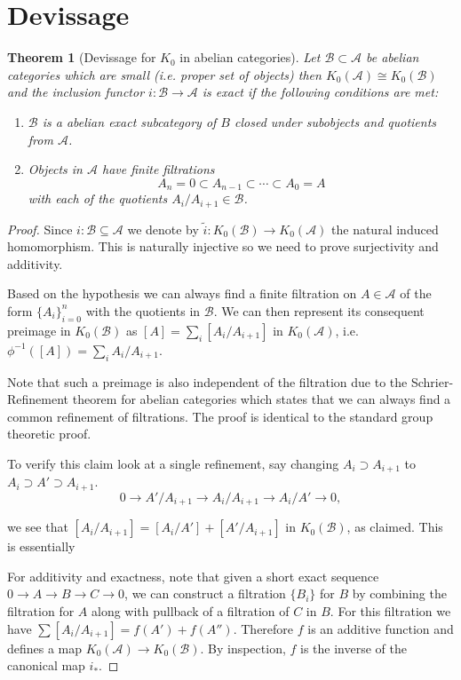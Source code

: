\documentclass[12pt]{report}
\numberwithin{equation}{section}
\newtheorem{theorem}[dummy]{Theorem}
\begin{document}
	\section{Devissage}
	\begin{theorem}[Devissage for $K_0$ in abelian categories]\label{devissagek0}
		Let $\mathcal B \subset \mathcal A$ be abelian categories which are small (i.e. proper set of objects) then $K_0(\mathcal A) \cong K_0(\mathcal B)$ and the inclusion functor $i:\mathcal{B} \to \mathcal{A}$ is exact if the following conditions are met:
		\begin{enumerate}
			\item $\mathcal B$ is a abelian exact subcategory of $B$ closed under subobjects and quotients from $\mathcal{A}$.
			\item Objects in $\mathcal{A}$ have finite filtrations \[ A_n=0 \subset A_{n-1} \subset \cdots \subset A_0 =A \] with each of the quotients $A_i/A_{i+1} \in \mathcal{B}$.
		\end{enumerate}
	\end{theorem}
	\begin{proof}
		Since $i:\mathcal{B} \subseteq \mathcal{A} $ we denote by $ \tilde{i} : K_0(\mathcal{B}) \to K_0(\mathcal{A})$ the natural induced homomorphism. This is naturally injective so we need to prove surjectivity and additivity.
		
		Based on the hypothesis we can always find a finite filtration on $A \in \mathcal{A}$ of the form $\{A_i\}_{i=0}^n$ with the quotients in $\mathcal{B}$. We can then represent its consequent preimage in $K_0(\mathcal{B})$ as $[A] = \sum_i [A_i / A_{i+1}]$ in $ K_0(\mathcal{A} )$, i.e. $\phi^{-1}([A])=\sum_i A_i/A_{i+1}$.
		
		Note that such a preimage is also independent of the filtration due to the Schrier-Refinement theorem for abelian categories which states that we can always find a common refinement of filtrations. The proof is identical to the standard group theoretic proof.
		
		To verify this claim look at a single refinement, say changing $A_i \supset A_{i+1}$ to $A_i \supset A' \supset A_{i+1}$. 
		\[
		0 \to A' / A_{i+1} \to A_i / A_{i+1} \to A_i / A' \to 0,
		\]
		
		we see that $[A_i / A_{i+1}] = [A_i / A'] + [A' / A_{i+1}]$ in $K_0(\mathcal{B})$, as claimed. This is essentially 
		
		For additivity and exactness, note that given a short exact sequence $0 \to A \to B \to C \to 0$, we can construct a filtration $\{B_i\}$ for $B$ by combining the filtration for $A$ along with pullback of a filtration of $C$ in $B$. For this filtration we have $\sum [A_i / A_{i+1}] = f(A') + f(A'')$. Therefore $f$ is an additive function and defines a map $K_0(\mathcal{A}) \to K_0(\mathcal{B})$. By inspection, $f$ is the inverse of the canonical map $i_*$.
	\end{proof}
\end{document}
